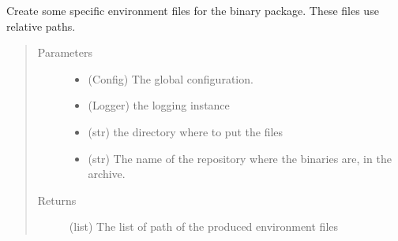 \documentclass[a4paper,10pt,english]{sphinxmanual}
\begin{document}
\begin{fulllineitems}
\label{\detokenize{apidoc_commands/commands:commands.package.produce_relative_env_files}}
Create some specific environment files for the binary package.
These files use relative paths.
\begin{quote}\begin{description}
\item[{Parameters}] \leavevmode\begin{itemize}
\item {} 
 \textendash{} (Config) The global configuration.

\item {} 
 \textendash{} (Logger) the logging instance

\item {} 
 \textendash{} (str) the directory where to put the files

\item {} 
 \textendash{} (str) 
The name of the repository where the binaries are, in the archive.

\end{itemize}

\item[{Returns}] \leavevmode
(list) The list of path of the produced environment files

\end{description}\end{quote}

\end{fulllineitems}

\end{document}
